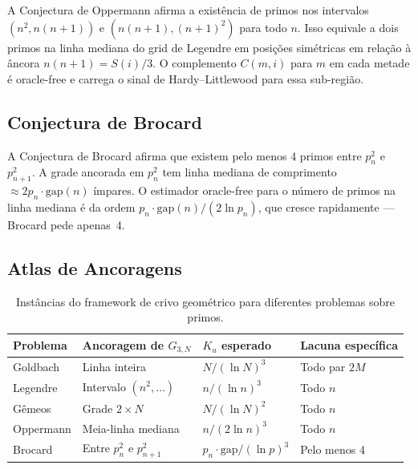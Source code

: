 \documentclass[12pt,a4paper]{article}
\theoremstyle{definition}
\theoremstyle{remark}
\newcommand{\Grid}{G_{3,N}}
\begin{document}
	A Conjectura de Oppermann afirma a existência de primos nos intervalos
	$(n^2,n(n{+}1))$ e $(n(n{+}1),(n{+}1)^2)$ para todo $n$.
	Isso equivale a dois primos na linha mediana do grid de Legendre em posições
	simétricas em relação à âncora $n(n{+}1)=S(i)/3$.
	O complemento $C(m,i)$ para $m$ em cada metade é oracle-free e carrega o
	sinal de Hardy--Littlewood para essa sub-região.
	
	\subsection{Conjectura de Brocard}
	
	A Conjectura de Brocard afirma que existem pelo menos 4 primos entre
	$p_n^2$ e $p_{n+1}^2$.
	A grade ancorada em $p_n^2$ tem linha mediana de comprimento
	$\approx 2p_n\cdot\mathrm{gap}(n)$ ímpares.
	O estimador oracle-free para o número de primos na linha mediana é da ordem
	$p_n\cdot\mathrm{gap}(n)/(2\ln p_n)$, que cresce rapidamente ---
	Brocard pede apenas~4.
	
	\subsection{Atlas de Ancoragens}
	
	\begin{table}[H]
		\centering
		\caption{Instâncias do framework de crivo geométrico para
			diferentes problemas sobre primos.}
		\label{tab:atlas}
		\smallskip
		\begin{tabular}{llll}
			\toprule
			Problema & Ancoragem de $\Grid$ & $K_u$ esperado & Lacuna específica \\
			\midrule
			Goldbach       & Linha inteira                    & $N/(\ln N)^3$                    & Todo par $2M$       \\
			Legendre       & Intervalo $(n^2,\dots)$          & $n/(\ln n)^3$                    & Todo $n$            \\
			Gêmeos         & Grade $2\times N$                & $N/(\ln N)^2$                    & Todo $n$            \\
			Oppermann      & Meia-linha mediana               & $n/(2\ln n)^3$                   & Todo $n$            \\
			Brocard        & Entre $p_n^2$ e $p_{n+1}^2$     & $p_n\cdot\mathrm{gap}/(\ln p)^3$ & Pelo menos 4        \\
			\bottomrule
		\end{tabular}
	\end{table}
	
\end{document}
